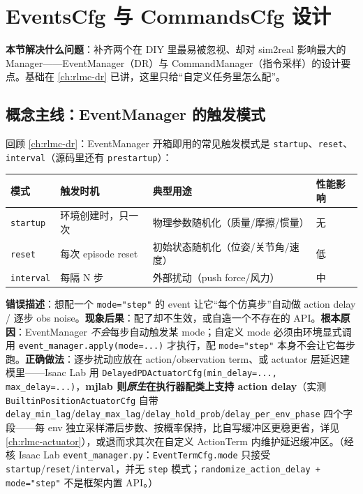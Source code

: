 \section{EventsCfg 与 CommandsCfg 设计}
\label{sec:rlmc-diy-events}

\textbf{本节解决什么问题}：补齐两个在 DIY 里最易被忽视、却对 sim2real 影响最大的 Manager——EventManager（DR）与 CommandManager（指令采样）的设计要点。基础在 \cref{ch:rlmc-dr} 已讲，这里只给“自定义任务里怎么配”。

\subsection{概念主线：EventManager 的触发模式}
\label{sec:rlmc-diy-events-mode}

回顾 \cref{ch:rlmc-dr}：EventManager 开箱即用的常见触发模式是 \verb|startup|、\verb|reset|、\verb|interval|（源码里还有 \verb|prestartup|）：

\begin{center}
\small
\begin{tabular}{@{}lp{3.6cm}p{4.4cm}l@{}}
\toprule
模式 & 触发时机 & 典型用途 & 性能影响 \\
\midrule
\verb|startup| & 环境创建时，只一次 & 物理参数随机化（质量/摩擦/惯量） & 无 \\
\verb|reset| & 每次 episode reset & 初始状态随机化（位姿/关节角/速度） & 低 \\
\verb|interval| & 每隔 N 步 & 外部扰动（push force/风力） & 中 \\
\bottomrule
\end{tabular}
\end{center}

\begin{pitfall}
\textbf{错误描述}：想配一个 \verb|mode="step"| 的 event 让它“每个仿真步”自动做 action delay / 逐步 obs noise。\textbf{现象后果}：配了却不生效，或自造一个不存在的 API。\textbf{根本原因}：EventManager \emph{不会}每步自动触发某 mode；自定义 mode 必须由环境显式调用 \verb|event_manager.apply(mode=...)| 才执行，配 \verb|mode="step"| 本身不会让它每步跑。\textbf{正确做法}：逐步扰动应放在 action/observation term、或 actuator 层延迟建模里——Isaac Lab 用 \verb|DelayedPDActuatorCfg(min_delay=..., max_delay=...)|，\textbf{mjlab 则\emph{原生}在执行器配类上支持 action delay}（实测 \verb|BuiltinPositionActuatorCfg| 自带 \verb|delay_min_lag|/\verb|delay_max_lag|/\verb|delay_hold_prob|/\verb|delay_per_env_phase| 四个字段——每 env 独立采样滞后步数、按概率保持，比自写缓冲区更稳更省，详见 \cref{ch:rlmc-actuator}），或退而求其次在自定义 ActionTerm 内维护延迟缓冲区。（经核 Isaac Lab \texttt{event\_manager.py}：\verb|EventTermCfg.mode| 只接受 \verb|startup|/\verb|reset|/\verb|interval|，并无 \verb|step| 模式；\texttt{randomize\_action\_delay + mode="step"} 不是框架内置 API。）
\end{pitfall}

